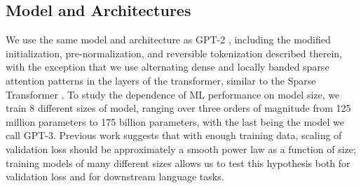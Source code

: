 \documentclass{article}
\begin{document}
    \subsection{Model and Architectures}
    \label{section:Model and Architectures}
    We use the same model and architecture as GPT-2 \cite{radford2019language}, including the modified initialization, pre-normalization, and reversible tokenization described therein, with the exception that we use alternating dense and locally banded sparse attention patterns in the layers of the transformer, similar to the Sparse Transformer \cite{child2019generating}. To study the dependence of ML performance on model size, we train 8 different sizes of model, ranging over three orders of magnitude from 125 million parameters to 175 billion parameters, with the last being the model we call GPT-3.  Previous work \cite{kaplan2020scaling} suggests that with enough training data, scaling of validation loss should be approximately a smooth power law as a function of size; training models of many different sizes allows us to test this hypothesis both for validation loss and for downstream language tasks.
\end{document}
